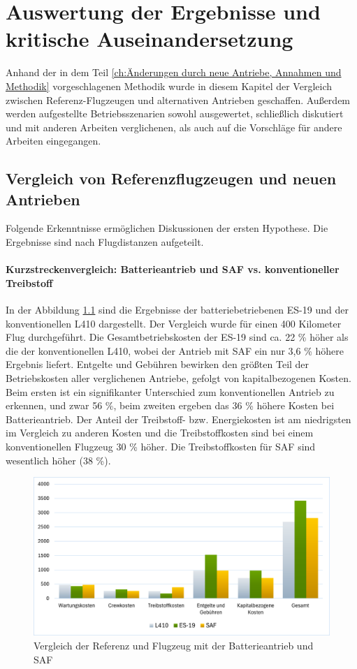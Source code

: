 \chapter{Auswertung der Ergebnisse und kritische Auseinandersetzung}
\label{ch:Auswertung der Ergebnisse}
Anhand der in dem Teil \ref{ch:Änderungen durch neue Antriebe, Annahmen und Methodik} 
vorgeschlagenen Methodik wurde in diesem Kapitel der Vergleich zwischen 
Referenz-Flugzeugen und alternativen Antrieben geschaffen.
Außerdem werden aufgestellte Betriebsszenarien sowohl ausgewertet, 
schließlich diskutiert und mit anderen Arbeiten verglichenen, 
als auch auf die Vorschläge für andere Arbeiten eingegangen.

\section{Vergleich von Referenzflugzeugen und neuen Antrieben}
\label{s:Ergebnisse_Flugzeuge}
Folgende Erkenntnisse ermöglichen Diskussionen der ersten Hypothese. 
Die Ergebnisse sind nach Flugdistanzen aufgeteilt.\\
%
\subsubsection{Kurzstreckenvergleich: Batterieantrieb und SAF vs. konventioneller Treibstoff}
%
In der Abbildung \ref{vergleichBA_Ref} sind die Ergebnisse der 
batteriebetriebenen ES-19 und der konventionellen L410 dargestellt.
Der Vergleich wurde für einen 400 Kilometer Flug durchgeführt.
%
Die Gesamtbetriebskosten der ES-19 sind ca. 22 \% höher als die der konventionellen L410, 
wobei der Antrieb mit SAF ein nur 3,6 \% höhere Ergebnis liefert. 
Entgelte und Gebühren bewirken den größten Teil der Betriebskosten aller verglichenen Antriebe, 
gefolgt von kapitalbezogenen Kosten. 
Beim ersten ist ein signifikanter Unterschied zum konventionellen Antrieb zu erkennen, 
und zwar 56 \%, beim zweiten ergeben das 36 \% höhere Kosten bei Batterieantrieb. 
Der Anteil der Treibstoff- bzw. Energiekosten ist am niedrigsten im Vergleich zu anderen Kosten 
und die Treibstoffkosten sind bei einem konventionellen Flugzeug 30 \% höher. 
Die Treibstoffkosten für SAF sind wesentlich höher (38 \%).

\begin{figure}[h]
	\centering
	\includegraphics[width=0.9\linewidth]{Bilder/VergleichBA_Ref.png}
	\caption[Betriebskosten]{Vergleich der Referenz und Flugzeug mit der Batterieantrieb und SAF}
	\label{vergleichBA_Ref}
\end{figure}

